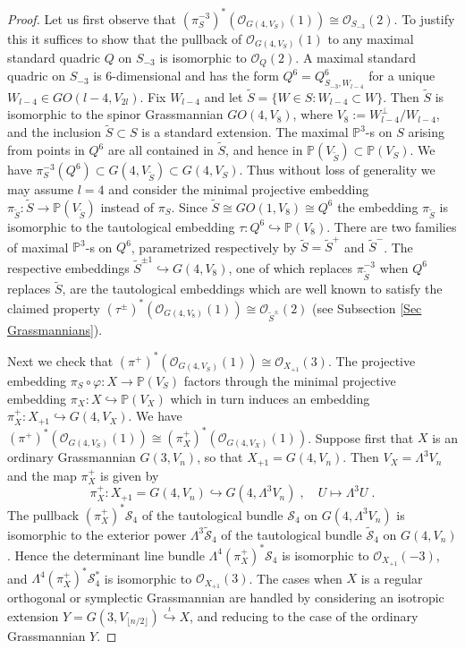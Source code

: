 \documentclass[12pt]{amsart}
\def\PP {{\mathbb P}}     %
\def\hw  {\hookrightarrow}
\def\mc {\mathcal}
\begin{document}
\begin{proof}
Let us first observe that $(\pi_S^{-3})^*(\mc O_{G(4,V_S)}(1))\cong \mc O_{S_{-3}}(2)$. To justify this it suffices to show that the pullback of $\mc O_{G(4,V_S)}(1)$ to any maximal standard quadric $Q$ on $S_{-3}$ is isomorphic to $\mc O_{Q}(2)$. A maximal standard quadric on $S_{-3}$ is 6-dimensional and has the form $Q^6=Q^{6}_{S_{-3},W_{l-4}}$ for a unique $W_{l-4}\in GO(l-4,V_{2l})$. Fix $W_{l-4}$ and let $\tilde S=\{W\in S: W_{l-4}\subset W\}$. Then $\tilde S$ is isomorphic to the spinor Grassmannian $GO(4,V_8)$, where $V_{8}:=W^\perp_{l-4}/W_{l-4}$, and the inclusion $\tilde S\subset S$ is a standard extension. The maximal $\PP^3$-s on $S$ arising from points in $Q^6$ are all contained in $\tilde S$, and hence in $\PP(V_{\tilde S})\subset\PP(V_S)$. We have $\pi_S^{-3}(Q^6)\subset G(4,V_{\tilde S})\subset G(4,V_S)$. Thus without loss of generality we may assume $l=4$ and consider the minimal projective embedding $\pi_{\tilde S}:\tilde S\to\PP(V_{\tilde S})$ instead of $\pi_S$. Since $\tilde S\cong GO(1,V_8)\cong Q^6$ the embedding $\pi_{\tilde S}$ is isomorphic to the tautological embedding $\tau:Q^6\hw \PP(V_{8})$. There are two families of maximal $\PP^3$-s on $Q^6$, parametrized respectively by $\tilde S=\tilde S^{+}$ and $\tilde S^{-}$. The respective embeddings $\tilde S^{\pm 1}\hw G(4,V_8)$, one of which replaces $\pi_{\tilde S}^{-3}$ when $Q^6$ replaces $\tilde S$, are the tautological embeddings which are well known to satisfy the claimed property $(\tau^\pm)^*(\mc O_{G(4,V_8)}(1))\cong \mc O_{\tilde S^{\pm}}(2)$ (see Subsection \ref{Sec Grassmannians}).

Next we check that $(\pi^+)^*(\mc O_{G(4,V_S)}(1))\cong \mc O_{X_{+1}}(3)$. The projective embedding $\pi_S\circ\varphi:X\to\PP(V_S)$ factors through the minimal projective embedding $\pi_X:X\hw\PP(V_X)$ which in turn induces an embedding $\pi_X^{+}:X_{+1}\hw G(4,V_X)$. We have $(\pi^+)^*(\mc O_{G(4,V_S)}(1))\cong(\pi_X^+)^*(\mc O_{G(4,V_X)}(1))$. Suppose first that $X$ is an ordinary Grassmannian $G(3,V_n)$, so that $X_{+1}=G(4,V_n)$. Then $V_{X}= \Lambda^3 V_n$ and the map $\pi_X^+$ is given by
$$
\pi_X^+:X_{+1}=G(4,V_n) \hw G(4,\Lambda^3 V_n)\;,\quad U\mapsto \Lambda^3 U \;.
$$
The pullback $(\pi_X^+)^*\mc S_4$ of the tautological bundle $\mc S_4$ on $G(4,\Lambda^3 V_n)$ is isomorphic to the exterior power $\Lambda^3\tilde{\mc S}_4$ of the tautological bundle $\tilde{\mc S}_4$ on $G(4,V_n)$. Hence the determinant line bundle $\Lambda^4(\pi_X^+)^*\mc S_4$ is isomorphic to $\mc O_{X_{+1}}(-3)$, and $\Lambda^4(\pi_X^+)^*\mc S^*_4$ is isomorphic to $\mc O_{X_{+1}}(3)$. The cases when $X$ is a regular orthogonal or symplectic Grassmannian are handled by considering an isotropic extension $Y = G(3,V_{\lfloor n/2\rfloor}) \stackrel{\iota}{\hw}X$, and reducing to the case of the ordinary Grassmannian $Y$.



\end{proof}
\end{document}
